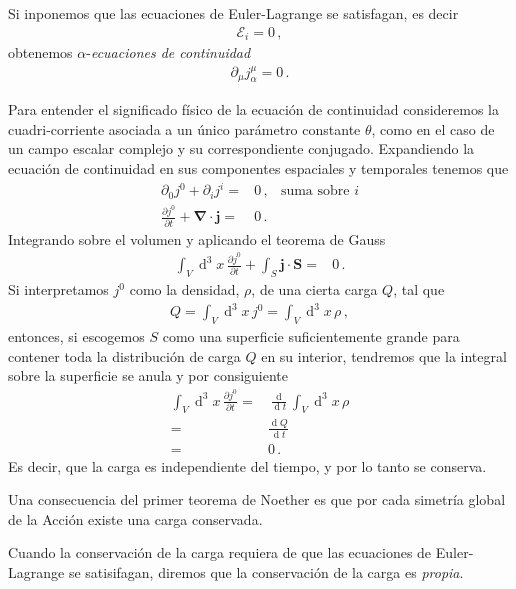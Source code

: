 Si inponemos que las ecuaciones de Euler-Lagrange se satisfagan, es decir
\begin{align}
  \mathcal{E}_i=0\,,
\end{align}
obtenemos $\alpha$-\emph{ecuaciones de continuidad}
\begin{align}
  \partial_{\mu} j^{\mu}_{\alpha}=0\,.
\end{align}

Para entender el significado físico de la ecuación de continuidad consideremos la cuadri-corriente asociada a un único parámetro constante $\theta$, como en el caso de un campo escalar complejo y su correspondiente conjugado. Expandiendo la ecuación de continuidad en sus componentes espaciales y temporales tenemos que
\begin{align}
  \partial_0 j^0+ \partial_i j^i=&0\,,&\text{suma sobre $i$}\nonumber\\
  \frac{\partial j^0}{\partial t}+ \boldsymbol{\nabla}\cdot\boldsymbol{j}=&0\,.
\end{align}
Integrando sobre el volumen y aplicando el teorema de Gauss
\begin{align}
  \int_V \operatorname{d}^3x\,\frac{\partial j^0}{\partial t}
+\int_S \boldsymbol{j}\cdot \boldsymbol{S}=&0\,.
\end{align}
Si interpretamos $j^0$ como la densidad, $\rho$, de una cierta carga $Q$, tal que
\begin{align}
  Q=\int_{V} \operatorname{d}^3x\, j^0= \int_{V} \operatorname{d}^3x\, \rho\,,
\end{align}
entonces, si escogemos $S$ como una superficie suficientemente grande para contener toda la distribución de carga $Q$ en su interior, tendremos que la integral sobre la superficie se anula y por consiguiente
\begin{align}
  \int_V \operatorname{d}^3x\,\frac{\partial j^0}{\partial t}=&
\frac{\operatorname{d}}{\operatorname{d}t}\int_V \operatorname{d}^3x\,\rho \nonumber\\
=&\frac{\operatorname{d}Q}{\operatorname{d}t}\nonumber\\
  =&0\,.
\end{align}
Es decir, que la carga es independiente del tiempo, y por lo tanto se conserva.

Una consecuencia del primer teorema de Noether es que por cada simetría global de la Acción existe una carga conservada. 

Cuando la conservación de la carga requiera de que las ecuaciones de Euler-Lagrange se satisifagan, diremos que la conservación de la carga es \emph{propia}.

